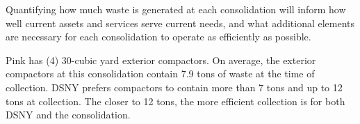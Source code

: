 
    Quantifying how much waste is generated at each consolidation will inform how well current assets and services serve current needs, and what additional elements are necessary for each consolidation to operate as efficiently as possible.
    
    Pink has (4) 30-cubic yard exterior compactors. On average, the exterior compactors at this consolidation contain 7.9 tons of waste at the time of collection. DSNY prefers compactors to contain more than 7 tons and up to 12 tons at collection. The closer to 12 tons, the more efficient collection is for both DSNY and the consolidation.
